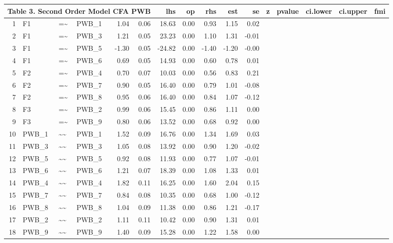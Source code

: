 \documentclass{article}
\begin{document}
\begin{table}[ht]
\centering
\begin{tabular}{rlllrrrrrrr}
 \multicolumn{ 6 }{l}{ Table 3. Second Order Model CFA PWB} \cr 
  \hline
 & lhs & op & rhs & est & se & z & pvalue & ci.lower & ci.upper & fmi \\ 
  \hline
1 & F1 & =\~{} & PWB\_1 & 1.04 & 0.06 & 18.63 & 0.00 & 0.93 & 1.15 & 0.02 \\ 
  2 & F1 & =\~{} & PWB\_3 & 1.21 & 0.05 & 23.23 & 0.00 & 1.10 & 1.31 & -0.01 \\ 
  3 & F1 & =\~{} & PWB\_5 & -1.30 & 0.05 & -24.82 & 0.00 & -1.40 & -1.20 & -0.00 \\ 
  4 & F1 & =\~{} & PWB\_6 & 0.69 & 0.05 & 14.93 & 0.00 & 0.60 & 0.78 & 0.01 \\ 
  5 & F2 & =\~{} & PWB\_4 & 0.70 & 0.07 & 10.03 & 0.00 & 0.56 & 0.83 & 0.21 \\ 
  6 & F2 & =\~{} & PWB\_7 & 0.90 & 0.05 & 16.40 & 0.00 & 0.79 & 1.01 & -0.08 \\ 
  7 & F2 & =\~{} & PWB\_8 & 0.95 & 0.06 & 16.40 & 0.00 & 0.84 & 1.07 & -0.12 \\ 
  8 & F3 & =\~{} & PWB\_2 & 0.99 & 0.06 & 15.45 & 0.00 & 0.86 & 1.11 & 0.00 \\ 
  9 & F3 & =\~{} & PWB\_9 & 0.80 & 0.06 & 13.52 & 0.00 & 0.68 & 0.92 & 0.00 \\ 
  10 & PWB\_1 & \~{}\~{} & PWB\_1 & 1.52 & 0.09 & 16.76 & 0.00 & 1.34 & 1.69 & 0.03 \\ 
  11 & PWB\_3 & \~{}\~{} & PWB\_3 & 1.05 & 0.08 & 13.92 & 0.00 & 0.90 & 1.20 & -0.02 \\ 
  12 & PWB\_5 & \~{}\~{} & PWB\_5 & 0.92 & 0.08 & 11.93 & 0.00 & 0.77 & 1.07 & -0.01 \\ 
  13 & PWB\_6 & \~{}\~{} & PWB\_6 & 1.21 & 0.07 & 18.39 & 0.00 & 1.08 & 1.33 & 0.01 \\ 
  14 & PWB\_4 & \~{}\~{} & PWB\_4 & 1.82 & 0.11 & 16.25 & 0.00 & 1.60 & 2.04 & 0.15 \\ 
  15 & PWB\_7 & \~{}\~{} & PWB\_7 & 0.84 & 0.08 & 10.35 & 0.00 & 0.68 & 1.00 & -0.12 \\ 
  16 & PWB\_8 & \~{}\~{} & PWB\_8 & 1.04 & 0.09 & 11.38 & 0.00 & 0.86 & 1.21 & -0.17 \\ 
  17 & PWB\_2 & \~{}\~{} & PWB\_2 & 1.11 & 0.11 & 10.42 & 0.00 & 0.90 & 1.31 & 0.01 \\ 
  18 & PWB\_9 & \~{}\~{} & PWB\_9 & 1.40 & 0.09 & 15.28 & 0.00 & 1.22 & 1.58 & 0.00 \\ 

\end{tabular}
\end{table}
\end{document}
